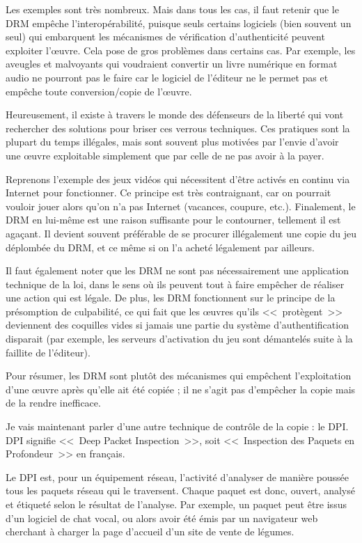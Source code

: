 Les exemples sont très nombreux.
Mais dans tous les cas, il faut retenir que le DRM empêche l'interopérabilité, puisque seuls certains logiciels (bien souvent un seul) qui embarquent les mécanismes de vérification d'authenticité peuvent exploiter l'œuvre.
Cela pose de gros problèmes dans certains cas.
Par exemple, les aveugles et malvoyants qui voudraient convertir un livre numérique en format audio ne pourront pas le faire car le logiciel de l'éditeur ne le permet pas et empêche toute conversion/copie de l'œuvre.

Heureusement, il existe à travers le monde des défenseurs de la liberté qui vont rechercher des solutions pour briser ces verrous techniques.
Ces pratiques sont la plupart du temps illégales, mais sont souvent plus motivées par l'envie d'avoir une œuvre exploitable simplement que par celle de ne pas avoir à la payer.

Reprenons l'exemple des jeux vidéos qui nécessitent d'être activés en continu via Internet pour fonctionner.
Ce principe est très contraignant, car on pourrait vouloir jouer alors qu'on n'a pas Internet (vacances, coupure, etc.).
Finalement, le DRM en lui-même est une raison suffisante pour le contourner, tellement il est agaçant.
Il devient souvent préférable de se procurer illégalement une copie du jeu déplombée du DRM, et ce même si on l'a acheté légalement par ailleurs.

Il faut également noter que les DRM ne sont pas nécessairement une application technique de la loi, dans le sens où ils peuvent tout à faire empêcher de réaliser une action qui est légale.
De plus, les DRM fonctionnent sur le principe de la présomption de culpabilité, ce qui fait que les œuvres qu'ils <<~protègent~>> deviennent des coquilles vides si jamais une partie du système d'authentification disparait (par exemple, les serveurs d'activation du jeu sont démantelés suite à la faillite de l'éditeur).

Pour résumer, les DRM sont plutôt des mécanismes qui empêchent l'exploitation d'une œuvre après qu'elle ait été copiée ; il ne s'agit pas d'empêcher la copie mais de la rendre inefficace.

Je vais maintenant parler d'une autre technique de contrôle de la copie : le DPI.
DPI signifie <<~Deep Packet Inspection~>>, soit <<~Inspection des Paquets en Profondeur~>> en français.

Le DPI est, pour un équipement réseau, l'activité d'analyser de manière poussée tous les paquets réseau qui le traversent.
Chaque paquet est donc, ouvert, analysé et étiqueté selon le résultat de l'analyse.
Par exemple, un paquet peut être issus d'un logiciel de chat vocal, ou alors avoir été émis par un navigateur web cherchant à charger la page d'accueil d'un site de vente de légumes.

